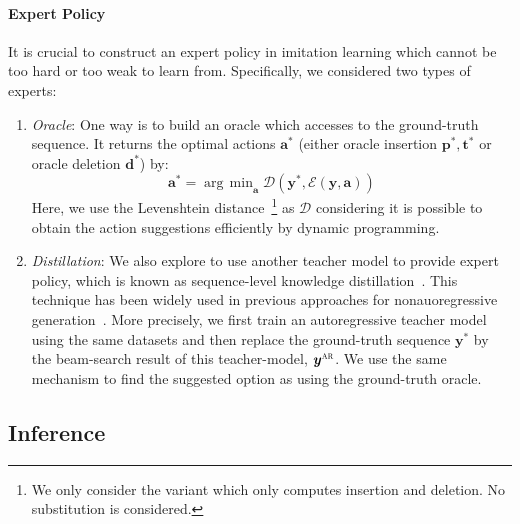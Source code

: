 \documentclass{article}
\DeclareMathOperator*{\argmin}{arg\!\ min}
\begin{document}
\paragraph{Expert Policy}
It is crucial to construct an expert policy in imitation learning which cannot be too hard or too weak to learn from. Specifically, we considered two types of experts:
\begin{enumerate}[leftmargin=*]
    \item \textit{Oracle}: One way is to build an oracle which accesses to the ground-truth sequence. It returns the optimal actions $\bm{a}^*$ (either oracle insertion $\bm{p}^*, \bm{t}^*$ or oracle deletion $\bm{d}^*$) by:
    \begin{equation}
        \bm{a}^* = \argmin_{\bm{a}} \mathcal{D}(\bm{y}^*, \mathcal{E}(\bm{y}, \bm{a}))
    \label{eq.oracle}
    \end{equation}
    Here, we use the Levenshtein distance~\citep{levenshtein1965binary}\footnote{We only consider the variant which only computes insertion and deletion. No substitution is considered.} as $\mathcal{D}$ considering it is possible to obtain the action suggestions efficiently by dynamic programming. 
\item \textit{Distillation}: 
    We also explore to use another teacher model to provide expert policy, which is known as sequence-level knowledge distillation~\citep{kim2016sequence}.
    This technique has been widely used in previous approaches for nonauoregressive generation~\citep{gu2017non}.
More precisely, we first train an autoregressive teacher model using the same datasets and then replace the ground-truth sequence $\bm{y^*}$ by the beam-search result of this teacher-model, $\bm{y^\textsc{ar}}$. We use the same mechanism to find the suggested option as using the ground-truth oracle.
    
    


\end{enumerate}

\subsection{Inference}
\end{document}

